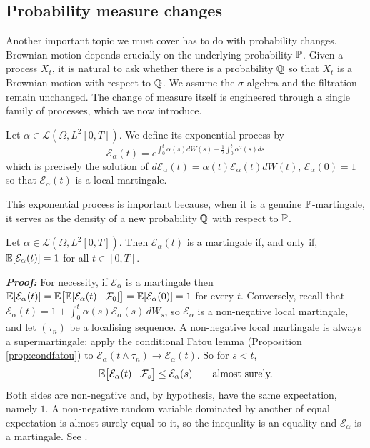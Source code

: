 \subsection{Probability measure changes}\label{subsec:measurechanges}

Another important topic we must cover has to do with probability changes. Brownian motion depends crucially on the underlying probability $\mathbb{P}$. Given a process $X_t$, it is natural to ask whether there is a probability $\mathbb{Q}$ so that $X_t$ is a Brownian motion with respect to $\mathbb{Q}$. We assume the $\sigma$-algebra and the filtration remain unchanged. The change of measure itself is engineered through a single family of processes, which we now introduce.

\begin{definition}
    Let $\alpha \in \mathcal{L}(\Omega, L^2[0,T])$. We define its exponential process by
    \begin{equation}\label{exponential_process_definition}
        \mathcal E _\alpha(t) = e^{  \int_0^t \alpha(s) dW(s)-\frac 1 2 \int_0^t \alpha^2(s)ds}
    \end{equation}
    which is precisely the solution of $d\mathcal E_\alpha(t) =\alpha(t)\mathcal{E}_\alpha (t) dW(t)$, $\mathcal E_\alpha(0) = 1$ so that $\mathcal{E}_\alpha(t)$ is a local martingale.
\end{definition}

This exponential process is important because, when it is a genuine $\mathbb{P}$-martingale, it serves as the density of a new probability $\mathbb{Q}$ with respect to $\mathbb{P}$.

\begin{theorem}\label{thm:exponentialmartingale}
    Let $\alpha \in \mathcal{L}(\Omega, L^2[0,T])$. Then $\mathcal E_\alpha(t)$ is a martingale if, and only if, $\mathbb{E}[\mathcal E_\alpha (t)]= 1 $ for all $t\in [0,T].$
\end{theorem}
\textbf{\textit{Proof:}} For necessity, if $\mathcal{E}_\alpha$ is a martingale then
$\mathbb{E}[\mathcal{E}_\alpha(t)] = \mathbb{E}\bigl[\mathbb{E}[\mathcal{E}_\alpha(t)\mid\mathcal{F}_0]\bigr]
= \mathbb{E}[\mathcal{E}_\alpha(0)] = 1$ for every $t$. Conversely, recall that
$\mathcal{E}_\alpha(t) = 1 + \int_0^t \alpha(s)\mathcal{E}_\alpha(s)\,dW_s$, so $\mathcal{E}_\alpha$ is
a non-negative local martingale, and let $(\tau_n)$ be a localising sequence. A non-negative local
martingale is always a supermartingale: apply the conditional Fatou lemma (Proposition
\ref{prop:condfatou}) to $\mathcal{E}_\alpha(t\wedge\tau_n) \to \mathcal{E}_\alpha(t)$. So for
$s<t$,
\[
\mathbb{E}\bigl[\mathcal{E}_\alpha(t) \mid \mathcal{F}_s\bigr] \leq \mathcal{E}_\alpha(s)
\qquad \text{almost surely.}
\]
Both sides are non-negative and, by hypothesis, have the same expectation, namely $1$. A
non-negative random variable dominated by another of equal expectation is almost surely equal to it,
so the inequality is an equality and $\mathcal{E}_\alpha$ is a martingale. See
\cite[Thm.\ 8.7.3]{kuo2006}. \qedfilledtext

